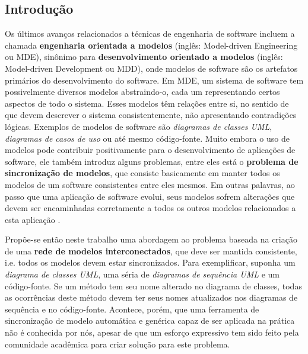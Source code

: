 \documentclass[cic,resumo-unibral]{iiufrgs}
\begin{document}
\begin{extendedsummary}

\section{Introdução}
Os últimos avanços relacionados a técnicas de engenharia de software incluem a chamada \textbf{engenharia orientada a modelos} (inglês: Model-driven Engineering ou MDE), sinônimo para \textbf{desenvolvimento orientado a modelos} (inglês: Model-driven Development ou MDD), onde modelos de software são os artefatos primários do desenvolvimento do software. Em MDE, um sistema de software tem possivelmente diversos modelos abstraindo-o, cada um representando certos aspectos de todo o sistema. Esses modelos têm relações entre si, no sentido de que devem descrever o sistema consistentemente, não apresentando contradições lógicas. Exemplos de modelos de software são \emph{diagramas de classes UML}, \emph{diagramas de casos de uso} ou até mesmo código-fonte. Muito embora o uso de modelos pode contribuir positivamente para o desenvolvimento de aplicações de software, ele também introduz alguns problemas, entre eles está o \textbf{problema de sincronização de modelos}, que consiste basicamente em manter todos os modelos de um software consistentes entre eles mesmos. Em outras palavras, ao passo que uma aplicação de software evolui, seus modelos sofrem alterações que devem ser encaminhadas corretamente a todos os outros modelos relacionados a esta aplicação \cite{diskin2011model}.

Propõe-se então neste trabalho uma abordagem ao problema baseada na criação de uma \textbf{rede de modelos interconectados}, que deve ser mantida consistente, i.e. todos os modelos devem estar sincronizados. Para exemplificar, suponha um \emph{diagrama de classes UML}, uma séria de \emph{diagramas de sequência UML} e um código-fonte. Se um método tem seu nome alterado no diagrama de classes, todas as ocorrências deste método devem ter seus nomes atualizados nos diagramas de sequência e no código-fonte. Acontece, porém, que uma ferramenta de sincronização de modelo automática e genérica capaz de ser aplicada na prática não é conhecida por nós, apesar de que um esforço expressivo tem sido feito pela comunidade acadêmica para criar solução para este problema.


\end{extendedsummary}
\end{document}
